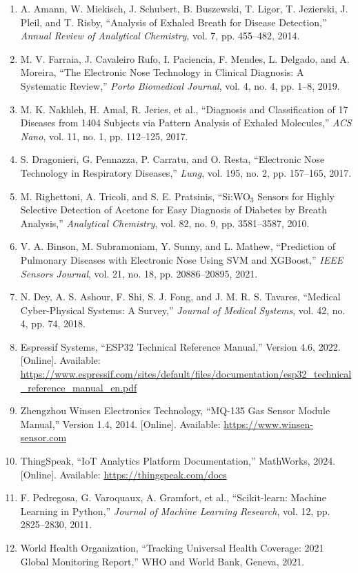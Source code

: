 \begin{enumerate}[leftmargin=1.5cm]
\item A. Amann, W. Miekisch, J. Schubert, B. Buszewski, T. Ligor, T. Jezierski, J. Pleil, and T. Risby, ``Analysis of Exhaled Breath for Disease Detection,'' \textit{Annual Review of Analytical Chemistry}, vol. 7, pp. 455--482, 2014.

\item M. V. Farraia, J. Cavaleiro Rufo, I. Paciencia, F. Mendes, L. Delgado, and A. Moreira, ``The Electronic Nose Technology in Clinical Diagnosis: A Systematic Review,'' \textit{Porto Biomedical Journal}, vol. 4, no. 4, pp. 1--8, 2019.

\item M. K. Nakhleh, H. Amal, R. Jeries, et al., ``Diagnosis and Classification of 17 Diseases from 1404 Subjects via Pattern Analysis of Exhaled Molecules,'' \textit{ACS Nano}, vol. 11, no. 1, pp. 112--125, 2017.

\item S. Dragonieri, G. Pennazza, P. Carratu, and O. Resta, ``Electronic Nose Technology in Respiratory Diseases,'' \textit{Lung}, vol. 195, no. 2, pp. 157--165, 2017.

\item M. Righettoni, A. Tricoli, and S. E. Pratsinis, ``Si:WO$_3$ Sensors for Highly Selective Detection of Acetone for Easy Diagnosis of Diabetes by Breath Analysis,'' \textit{Analytical Chemistry}, vol. 82, no. 9, pp. 3581--3587, 2010.

\item V. A. Binson, M. Subramoniam, Y. Sunny, and L. Mathew, ``Prediction of Pulmonary Diseases with Electronic Nose Using SVM and XGBoost,'' \textit{IEEE Sensors Journal}, vol. 21, no. 18, pp. 20886--20895, 2021.

\item N. Dey, A. S. Ashour, F. Shi, S. J. Fong, and J. M. R. S. Tavares, ``Medical Cyber-Physical Systems: A Survey,'' \textit{Journal of Medical Systems}, vol. 42, no. 4, pp. 74, 2018.

\item Espressif Systems, ``ESP32 Technical Reference Manual,'' Version 4.6, 2022. [Online]. Available: \url{https://www.espressif.com/sites/default/files/documentation/esp32_technical_reference_manual_en.pdf}

\item Zhengzhou Winsen Electronics Technology, ``MQ-135 Gas Sensor Module Manual,'' Version 1.4, 2014. [Online]. Available: \url{https://www.winsen-sensor.com}

\item ThingSpeak, ``IoT Analytics Platform Documentation,'' MathWorks, 2024. [Online]. Available: \url{https://thingspeak.com/docs}

\item F. Pedregosa, G. Varoquaux, A. Gramfort, et al., ``Scikit-learn: Machine Learning in Python,'' \textit{Journal of Machine Learning Research}, vol. 12, pp. 2825--2830, 2011.

\item World Health Organization, ``Tracking Universal Health Coverage: 2021 Global Monitoring Report,'' WHO and World Bank, Geneva, 2021.
\end{enumerate}
